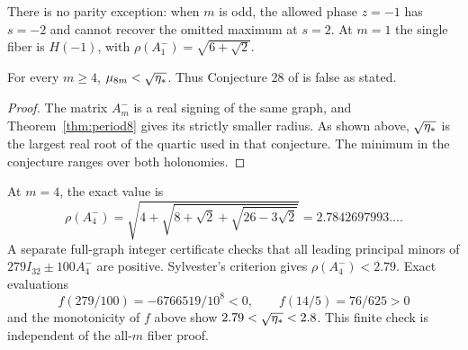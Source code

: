 There is no parity exception: when $m$ is odd, the allowed phase $z=-1$
has $s=-2$ and cannot recover the omitted maximum at $s=2$.
At $m=1$ the single fiber is $H(-1)$, with
$\rho(A_1^-)=\sqrt{6+\sqrt2}$.


\begin{corollary}\label{cor:conjecture}
For every $m\ge4$, $\mu_{8m}<\sqrt{\eta_*}$. Thus Conjecture 28 of
\cite{Suvagiya2026} is false as stated.
\end{corollary}
\begin{proof}
The matrix $A_m^-$ is a real signing of the same graph, and
Theorem~\ref{thm:period8} gives its strictly smaller radius. As shown above,
$\sqrt{\eta_*}$ is the largest real root of the quartic used in that
conjecture. The minimum in the conjecture ranges over both holonomies.
\end{proof}

At $m=4$, the exact value is
\[
 \rho(A_4^-)=\sqrt{4+\sqrt{8+\sqrt2+\sqrt{26-3\sqrt2}}}
             =2.7842697993\ldots.
\]
A separate full-graph integer certificate checks that all leading principal
minors of $279I_{32}\pm100A_4^-$ are positive. Sylvester's criterion gives
$\rho(A_4^-)<2.79$. Exact evaluations
\[
 f(279/100)=-6766519/10^8<0,\qquad f(14/5)=76/625>0
\]
and the monotonicity of $f$ above show $2.79<\sqrt{\eta_*}<2.8$.
This finite check is independent of the all-$m$ fiber proof.
